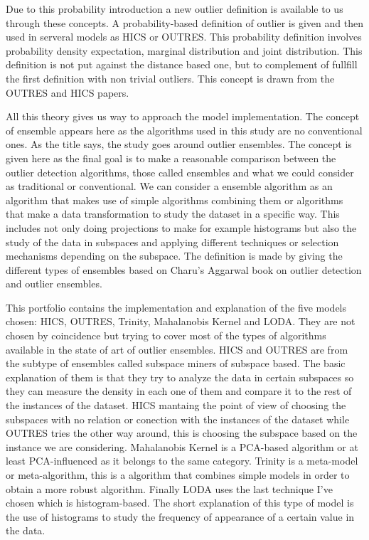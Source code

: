 Due to this probability introduction a new outlier definition is available to us through these concepts. A probability-based definition of outlier is given and then used in serveral models as HICS or OUTRES. This probability definition involves probability density expectation, marginal distribution and joint distribution. This definition is not put against the distance based one, but to complement of fullfill the first definition with non trivial outliers. This concept is drawn from the OUTRES and HICS papers.

All this theory gives us way to approach the model implementation. The concept of ensemble appears here as the algorithms used in this study are no conventional ones. As the title says, the study goes around outlier ensembles. The concept is given here as the final goal is to make a reasonable comparison between the outlier detection algorithms, those called ensembles and what we could consider as traditional or conventional. We can consider a ensemble algorithm as an algorithm that makes use of simple algorithms combining them or algorithms that make a data transformation to study the dataset in a specific way. This includes not only doing projections to make for example histograms but also the study of the data in subspaces and applying different techniques or selection mechanisms depending on the subspace. The definition is made by giving the different types of ensembles based on Charu's Aggarwal book on outlier detection and outlier ensembles.

This portfolio contains the implementation and explanation of the five models chosen: HICS, OUTRES, Trinity, Mahalanobis Kernel and LODA. They are not chosen by coincidence but trying to cover most of the types of algorithms available in the state of art of outlier ensembles. HICS and OUTRES are from the subtype of ensembles called subspace miners of subspace based. The basic explanation of them is that they try to analyze the data in certain subspaces so they can measure the density in each one of them and compare it to the rest of the instances of the dataset. HICS mantaing the point of view of choosing the subspaces with no relation or conection with the instances of the dataset while OUTRES tries the other way around, this is choosing the subspace based on the instance we are considering. Mahalanobis Kernel is a PCA-based algorithm or at least PCA-influenced as it belongs to the same category. Trinity is a meta-model or meta-algorithm, this is a algorithm that combines simple models in order to obtain a more robust algorithm. Finally LODA uses the last technique I've chosen which is histogram-based. The short explanation of this type of model is the use of histograms to study the frequency of appearance of a certain value in the data.

